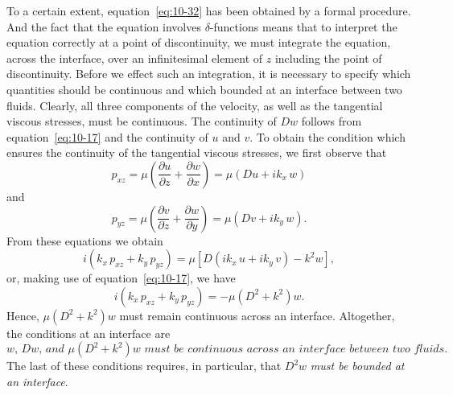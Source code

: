 To a certain extent, equation~\eqref{eq:10-32} has been obtained by a formal procedure. And the fact that the equation involves $\delta$-functions means that to interpret the equation correctly at a point of discontinuity, we must integrate the equation, across the interface, over an infinitesimal element of $z$ including the point of discontinuity. Before we effect such an integration, it is necessary to specify which quantities should be continuous and which bounded at an interface between two fluids. Clearly, all three components of the velocity, as well as the tangential viscous stresses, must be continuous. The continuity of $Dw$ follows from equation~\eqref{eq:10-17} and the continuity of $u$ and $v$. To obtain the condition which ensures the continuity of the tangential viscous stresses, we first observe that
\begin{equation}
\label{eq:10-33}
p_{xz} = \mu\!\left(\frac{\partial u}{\partial z}+\frac{\partial w}{\partial x}\right) = \mu(Du+ik_x\,w)
\end{equation}
and
\begin{equation}
\label{eq:10-34}
p_{yz} = \mu\!\left(\frac{\partial v}{\partial z}+\frac{\partial w}{\partial y}\right) = \mu(Dv+ik_y\,w).
\end{equation}
From these equations we obtain
\begin{equation}
\label{eq:10-35}
i(k_x\,p_{xz}+k_y\,p_{yz}) = \mu[D(ik_x\,u+ik_y\,v)-k^2w],
\end{equation}
or, making use of equation~\eqref{eq:10-17}, we have
\begin{equation}
i(k_x\,p_{xz}+k_y\,p_{yz}) = -\mu(D^2+k^2)w.
\end{equation}
Hence, $\mu(D^2+k^2)w$ must remain continuous across an interface. Altogether, the conditions at an interface are
\begin{equation}
\label{eq:10-36}
\textit{$w$, $Dw$, and $\mu(D^2+k^2)w$ must be continuous across an interface between two fluids.}
\end{equation}
The last of these conditions requires, in particular, that $D^2w$ \emph{must be bounded at an interface}.

